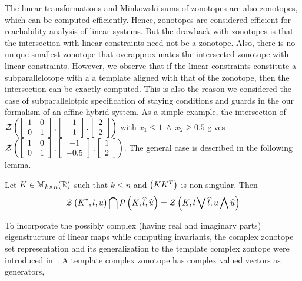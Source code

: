 The linear transformations and Minkowski sums of zonotopes are also
zonotopes, which can be computed efficiently.  Hence, zonotopes are
considered efficient for reachability analysis of linear systems.  But
the drawback with zonotopes is that the intersection with linear
constraints need not be a zonotope.  Also, there is no unique smallest
zonotope that overapproximates the intersected zonotope with linear
constraints.  However, we observe that if the linear constraints
constitute a subparallelotope with a a template aligned with that of
the zonotope, then the intersection can be exactly computed.  This is
also the reason we considered the case of subparallelotpic
specification of staying conditions and guards in the our formalism of
an affine hybrid system.  As a simple example, the intersection of
$\mathcal{Z}\left(\left[\begin{array}{l l}1 & 0 \\ 0 &
      1\end{array}\right],\left[\begin{array}{c}-1\\ -1\end{array}\right],\left[\begin{array}{c}2\\ 2\end{array}\right]\right)$
with $x_1\leq 1~\wedge~x_2\geq 0.5$ gives $\mathcal{Z}\left(\left[\begin{array}{l
        l}1 & 0 \\ 0 &
      1\end{array}\right],\left[\begin{array}{c}-1\\ -0.5\end{array}\right],\left[\begin{array}{c}1\\ 2\end{array}\right]\right)$.
The general case is described in the following lemma.
%
\begin{lemma}\label{lem:motivation}
Let $K\in\mathbb{M}_{k\times n}(\mathbb{R})$ such that $k\leq n$ and $\left(KK^T\right)$ is
non-singular.  Then
\[
\mathcal{Z}\left(K^{\bm{\dagger}},l,u\right) \bigcap \mathcal{P}\left(K,\widehat{l},\widehat{u}\right)
= \mathcal{Z}\left(K,l\bigvee \widehat{l},u\bigwedge \widehat{u}\right)
\]
\end{lemma}
%
To incorporate the possibly complex (having real and imaginary parts)
eigenstructure of linear maps while computing invariants, the complex
zonotope set representation and its generalization to the template
complex zontope were introduced in~\cite{adimoolam2016using,tcz2017}.
A template complex zonotope has complex valued vectors as generators,
